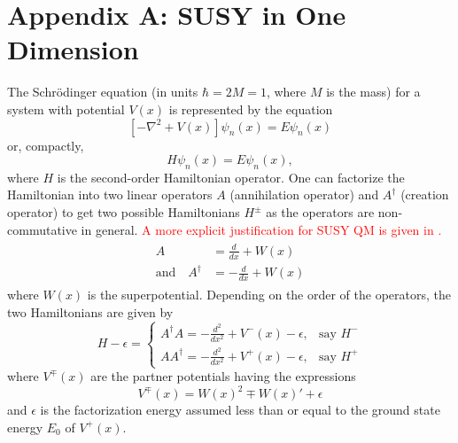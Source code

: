 \documentclass[12pt]{article}
\numberwithin{equation}{section} %
\begin{document}
\appendix


\renewcommand{\theequation}{A.\arabic{equation}} %
\setcounter{equation}{0}

\section*{Appendix A: SUSY in  One Dimension}

The Schr\"{o}dinger equation (in units $\hbar=2M=1$, where \( M \) is the mass) for a system with potential \( V(x) \) is represented by the equation 
\begin{equation} \label{F:SE}
    \left[-\nabla^2 + V(x)\right]\psi_n(x) = E\psi_n(x)
\end{equation}
or, compactly, 
\begin{equation}\label{F:SE-compact}
    H\psi_n(x) = E\psi_n(x),
\end{equation}
where \(H\) is the second-order Hamiltonian operator. One can factorize the Hamiltonian into two linear operators \( A \) (annihilation operator) and 
\( A^\dagger \) (creation operator) to get two possible Hamiltonians 
\( H^{\pm} \) as the operators are non-commutative in general. \textcolor{red}{A more explicit justification for SUSY QM is given in \cite{fellows2009factorization}.}
\begin{align}\label{F:A-1D}
    \begin{split}
        A &= \frac{d}{dx} + W(x)\\
        \text{and}\quad A^\dagger &= -\frac{d}{dx} + W(x)  
    \end{split}
\end{align}
where \( W(x) \) is the superpotential. Depending on the order of the operators, the two Hamiltonians are given by
\begin{equation}\label{F:H-1D}
    H - \epsilon=
    \begin{cases}
        A^\dagger A=-\frac{d^2}{dx^2} + V^-(x) - \epsilon, & \text{say } H^-\\
        A A^\dagger=-\frac{d^2}{dx^2} + V^+(x) - \epsilon, & \text{say } H^+
    \end{cases}
\end{equation}
where \( V^{\mp}(x) \) are the partner potentials having the expressions
\begin{equation}\label{F:V-1D}
    V^\mp(x)=W(x)^2\mp W(x)'+\epsilon
\end{equation}
and $\epsilon$ is the factorization energy assumed less than or equal to the ground state energy $E_0$ of $V^+(x)$.
\end{document}
